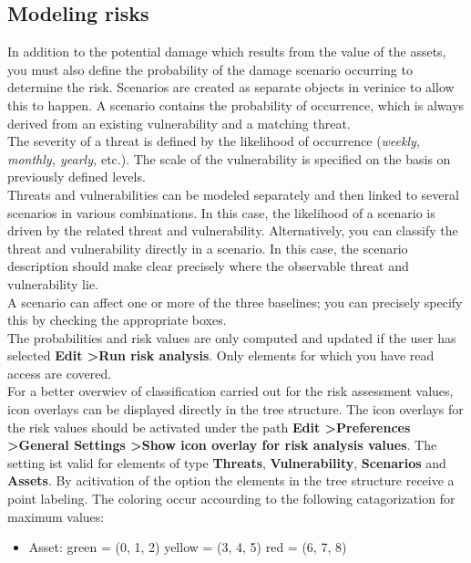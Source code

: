 \documentclass[a4paper,10pt]{book}
\begin{document}
\subsection{Modeling risks}
In addition to the potential damage which results from the value of the assets, you must also define the
probability of the damage scenario occurring to determine the risk. Scenarios are created as separate objects
in verinice to allow this to happen. A scenario contains the probability of occurrence, which is always derived
from an existing vulnerability and a matching threat.
\newline\\
The severity of a threat is defined by the likelihood of occurrence ({\em weekly, monthly, yearly,} etc.).
The scale of the vulnerability is specified on the basis on previously defined levels.
\newline\\
Threats and vulnerabilities can be modeled separately and then linked to several scenarios in various
combinations. In this case, the likelihood of a scenario is driven by the related threat and vulnerability.
Alternatively, you can classify the threat and vulnerability directly in a scenario. In this case,
the scenario description should make clear precisely where the observable threat and vulnerability lie.
\newline\\
A scenario can affect one or more of the three baselines; you can precisely specify this by checking the appropriate boxes.
\newline\\
The probabilities and risk values are only computed and updated if the user has selected \textbf{Edit \textgreater Run risk analysis}.
Only elements for which you have read access are covered.
\newline\\
For a better overwiev of classification carried out for the risk assessment values, icon overlays can be displayed
directly in the tree structure. The icon overlays for the risk values should be activated under the path
\textbf{Edit \textgreater Preferences \textgreater General Settings \textgreater Show icon overlay for risk analysis values}.
The setting ist valid for elements of type \textbf {Threats}, \textbf {Vulnerability}, \textbf {Scenarios} and \textbf {Assets}.
By acitivation of the option the elements in the tree structure receive a point labeling. The coloring occur accourding
to the following catagorization for maximum values:
\begin{itemize}
 \item Asset:
 \subitem green = (0, 1, 2)
 \subitem yellow = (3, 4, 5)
 \subitem red = (6, 7, 8)
\end{itemize}
\end{document}
